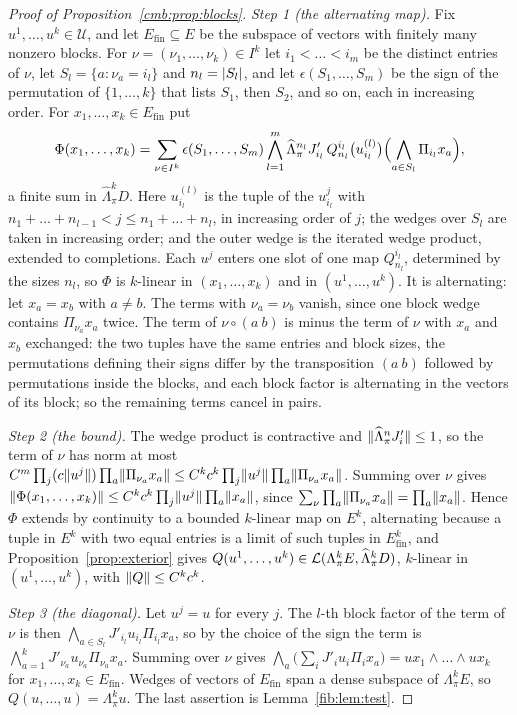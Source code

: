 \begin{proof}[Proof of Proposition~\ref{cmb:prop:blocks}]
\emph{Step 1 (the alternating map).} Fix $u^1,\dots,u^k\in\mathcal U$, and let $E_{\mathrm{fin}}\subseteq E$ be the
subspace of vectors with finitely many nonzero blocks. For $\nu=(\nu_1,\dots,\nu_k)\in I^k$ let $i_1<\dots<i_m$ be the
distinct entries of $\nu$, let $S_l=\{a:\nu_a=i_l\}$ and $n_l=\lvert S_l\rvert$, and let $\epsilon(S_1,\dots,S_m)$ be the sign of
the permutation of $\{1,\dots,k\}$ that lists $S_1$, then $S_2$, and so on, each in increasing order. For
$x_1,\dots,x_k\in E_{\mathrm{fin}}$ put
\[
 \Phi(x_1,\dots,x_k)=\sum_{\nu\in I^k}\epsilon(S_1,\dots,S_m)\bigwedge_{l=1}^m\widehat\Lambda^{n_l}_\pi J'_{i_l}\,
 Q^{i_l}_{n_l}\bigl(u^{(l)}_{i_l}\bigr)\Bigl(\bigwedge_{a\in S_l}\Pi_{i_l}x_a\Bigr),
\]
a finite sum in $\widehat\Lambda^k_\pi D$. Here $u^{(l)}_{i_l}$ is the tuple of the $u^j_{i_l}$ with
$n_1+\dots+n_{l-1}<j\le n_1+\dots+n_l$, in increasing order of $j$; the wedges over $S_l$ are taken in increasing order;
and the outer wedge is the iterated wedge product, extended to completions. Each $u^j$ enters one slot of one map
$Q^{i_l}_{n_l}$, determined by the sizes $n_l$, so $\Phi$ is $k$-linear in $(x_1,\dots,x_k)$ and in $(u^1,\dots,u^k)$.
It is alternating: let $x_a=x_b$ with $a\ne b$. The terms with $\nu_a=\nu_b$ vanish, since one block wedge contains
$\Pi_{\nu_a}x_a$ twice. The term of $\nu\circ(a\ b)$ is minus the term of $\nu$ with $x_a$ and $x_b$ exchanged: the two
tuples have the same entries and block sizes, the permutations defining their signs differ by the transposition $(a\ b)$
followed by permutations inside the blocks, and each block factor is alternating in the vectors of its block; so the
remaining terms cancel in pairs.

\emph{Step 2 (the bound).} The wedge product is contractive and $\lVert \widehat\Lambda^n_\pi J'_i\rVert\le1$, so the term of
$\nu$ has norm at most $C^m\prod_j(c\lVert u^j\rVert)\prod_a\lVert \Pi_{\nu_a}x_a\rVert\le C^kc^k\prod_j\lVert u^j\rVert\prod_a
\lVert \Pi_{\nu_a}x_a\rVert$. Summing over $\nu$ gives $\lVert \Phi(x_1,\dots,x_k)\rVert\le C^kc^k\prod_j\lVert u^j\rVert\prod_a\lVert x_a\rVert$,
since $\sum_\nu\prod_a\lVert \Pi_{\nu_a}x_a\rVert=\prod_a\lVert x_a\rVert$. Hence $\Phi$ extends by continuity to a bounded
$k$-linear map on $E^k$, alternating because a tuple in $E^k$ with two equal entries is a limit of such tuples in
$E_{\mathrm{fin}}^k$, and Proposition~\ref{prop:exterior} gives $Q(u^1,\dots,u^k)\in\mathcal L(\Lambda^k_\pi E,\widehat\Lambda^k_\pi D)$,
$k$-linear in $(u^1,\dots,u^k)$, with $\lVert Q\rVert\le C^kc^k$.

\emph{Step 3 (the diagonal).} Let $u^j=u$ for every $j$. The $l$-th block factor of the term of $\nu$ is then
$\bigwedge_{a\in S_l}J'_{i_l}u_{i_l}\Pi_{i_l}x_a$, so by the choice of the sign the term is
$\bigwedge_{a=1}^kJ'_{\nu_a}u_{\nu_a}\Pi_{\nu_a}x_a$. Summing over $\nu$ gives
$\bigwedge_a\bigl(\sum_iJ'_iu_i\Pi_ix_a\bigr)=ux_1\wedge\dots\wedge ux_k$ for $x_1,\dots,x_k\in E_{\mathrm{fin}}$. Wedges
of vectors of $E_{\mathrm{fin}}$ span a dense subspace of $\Lambda^k_\pi E$, so $Q(u,\dots,u)=\Lambda^k_\pi u$. The last
assertion is Lemma~\ref{fib:lem:test}.
\end{proof}

